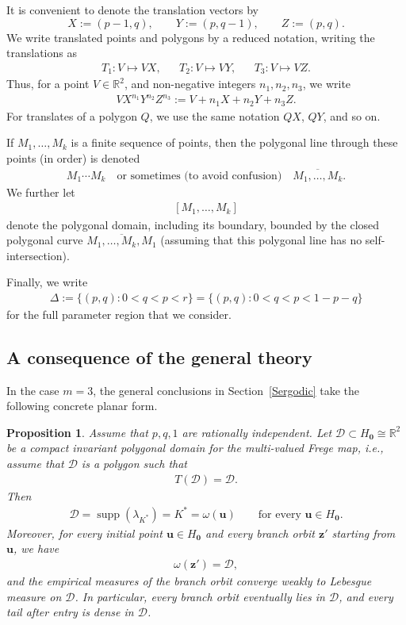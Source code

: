 \documentclass[11pt,reqno,tbtags,a4paper]{amsart}
\numberwithin{equation}{section}
\theoremstyle{plain}%
\newtheorem{proposition}[theorem]{Proposition}
\theoremstyle{definition}
\theoremstyle{remark}
\newcommand\set[1]{\ensuremath{\{#1\}}}
\newcommand\bbR{\mathbb R}
\newcommand\supp{\operatorname{supp}}
\newcommand\gl{\lambda}
\newcommand\cD{\mathcal D}
\newcommand\cL{{\omega}}
\newcommand\Ho{H_{\0}}
\newcommand\vu{\mathbf{u}}
\newcommand\vz{\mathbf{z}}
\newcommand\Kx{K^*}
\newcommand\linje[1]{\overline{#1}}
\newcommand\0{{\boldsymbol 0}}
\newcommand\1{{\boldsymbol 1}}
\begin{document}
It is convenient to denote the translation vectors by
\begin{equation}\label{m3-XYZ}
X:=(p-1,q),\qquad Y:=(p,q-1),\qquad Z:=(p,q).
\end{equation}
We write translated points and polygons 
by a reduced notation, writing the translations as
\begin{align}\label{apT}
  T_1:V\mapsto VX, &&
  T_2:V\mapsto VY, &&
  T_3:V\mapsto VZ.
\end{align}
Thus, for a point $V\in\bbR^2$,
and non-negative integers $n_1,n_2,n_3$, we write
\begin{align}\label{fb11}
V X^{n_1}Y^{n_2}Z^{n_3}:=V+n_1X+n_2Y+n_3Z.
\end{align}
For translates of a polygon $Q$,
we use the same notation $QX$, $QY$,  and so on.

If $M_1,\dots,M_k$ is a finite sequence of points, then
the polygonal line through these points (in order) is denoted
\begin{align} \label{linje}
M_1\dotsm M_k
\quad\text{or sometimes (to avoid confusion)}\quad
\linje{M_1,\dots, M_k}
.\end{align}
We further let
\begin{align}\label{polyM}
[M_1,\dots,M_k]
\end{align}
denote the polygonal domain, including its boundary, bounded by the closed polygonal curve
$\linje{M_1,\dots,M_k,M_1}$
(assuming that this polygonal line has no self-intersection).

Finally, we write
\begin{align}\label{Delta}
\Delta:=\{(p,q):0<q<p<r\}
=\set{(p,q):0<q<p<1-p-q}
\end{align}
for the full parameter region that we consider.

\subsection{A consequence of the general theory}\label{SSm3bridge}

In the case $m=3$,
the general conclusions in Section~\ref{Sergodic}
take the following concrete planar form.
 
\begin{proposition}\label{Pm3bridge}
Assume that $p,q,1$ are rationally independent. Let $\cD\subset\Ho\cong\bbR^2$
be a compact invariant polygonal domain for the multi-valued Frege map, i.e.,
assume that $\cD$ is a polygon such that
\begin{align}
T(\cD)=\cD.
\end{align}
Then
\begin{align}
\cD=\supp(\gl_{\Kx})=\Kx=\cL(\vu)
\qquad\text{for every }\vu\in\Ho.
\end{align}
Moreover, for every initial point $\vu\in\Ho$ and every branch orbit $\vz'$
starting from $\vu$, we have
\begin{align}
\omega(\vz')=\cD,
\end{align}
and the empirical measures of the branch orbit converge weakly to Lebesgue
measure on $\cD$. In particular, every branch orbit eventually lies in $\cD$,
and every tail after entry is dense in $\cD$.
\end{proposition}
\end{document}
